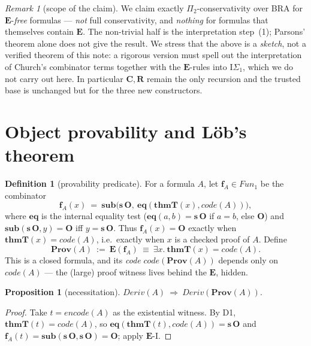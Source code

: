 \documentclass[11pt]{article}
\theoremstyle{plain}
\newtheorem{proposition}[theorem]{Proposition}
\theoremstyle{definition}
\newtheorem{definition}[theorem]{Definition}
\theoremstyle{remark}
\newtheorem{remark}[theorem]{Remark}
\newcommand{\code}[1]{\mathit{code}(#1)}
\newcommand{\sub}{\mathbf{sub}}
\newcommand{\thmT}{\mathbf{thmT}}
\newcommand{\natEqF}{\mathbf{eq}}
\newcommand{\Ee}{\mathbf{E}}
\newcommand{\Prov}{\mathbf{Prov}}
\newcommand{\Fun}{\mathit{Fun}}
\newcommand{\Deriv}{\mathit{Deriv}}
\begin{document}
\begin{remark}[scope of the claim]
We claim exactly $\Pi_2$-conservativity over BRA for $\Ee$-\emph{free} formulas
--- \emph{not} full conservativity, and \emph{nothing} for formulas that
themselves contain $\Ee$. The non-trivial half is the interpretation step~(1);
Parsons' theorem alone does not give the result. We stress that the above is a
\emph{sketch}, not a verified theorem of this note: a rigorous version must spell
out the interpretation of Church's combinator terms together with the
$\Ee$-rules into $\mathrm{I}\Sigma_1$, which we do not carry out here. In
particular $\mathbf{C},\mathbf{R}$ remain the only recursion and the trusted base
is unchanged but for the three new constructors.
\end{remark}

\section{Object provability and L\"ob's theorem}

\begin{definition}[provability predicate]
For a formula $A$, let $\mathbf{f}_A\in\Fun_1$ be the combinator
\[
  \mathbf{f}_A(x)\ =\ \sub\bigl(\mathbf{s}\,\mathbf{O},\ \natEqF(\thmT(x),\code{A})\bigr),
\]
where $\natEqF$ is the internal equality test ($\natEqF(a,b)=\mathbf{s}\,\mathbf{O}$
if $a=b$, else $\mathbf{O}$) and $\sub(\mathbf{s}\,\mathbf{O},y)=\mathbf{O}$ iff
$y=\mathbf{s}\,\mathbf{O}$. Thus $\mathbf{f}_A(x)=\mathbf{O}$ exactly when
$\thmT(x)=\code{A}$, i.e.\ exactly when $x$ is a checked proof of $A$. Define
\[
  \Prov(A)\ :=\ \Ee(\mathbf{f}_A)\ \equiv\ \exists x.\ \thmT(x)=\code{A}.
\]
This is a closed formula, and its \emph{code} $\code{\Prov(A)}$ depends only on
$\code{A}$ --- the (large) proof witness lives behind the $\Ee$, hidden.
\end{definition}

\begin{proposition}[necessitation]
$\Deriv(A)\ \Longrightarrow\ \Deriv(\Prov(A)).$
\end{proposition}
\begin{proof}
Take $t=\mathit{encode}(A)$ as the existential witness. By D1,
$\thmT(t)=\code{A}$, so $\natEqF(\thmT(t),\code{A})=\mathbf{s}\,\mathbf{O}$ and
$\mathbf{f}_A(t)=\sub(\mathbf{s}\,\mathbf{O},\mathbf{s}\,\mathbf{O})=\mathbf{O}$;
apply $\Ee$-I.
\end{proof}
\end{document}
